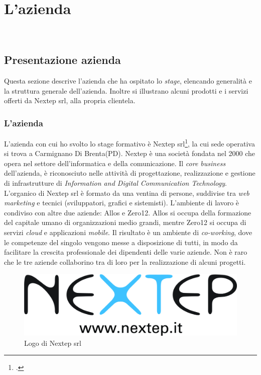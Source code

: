 
\chapter{L'azienda}
\label{cap:azienda}
\\




\section{Presentazione azienda}
Questa sezione descrive l'azienda che ha ospitato lo \emph{stage}, elencando generalità e la struttura generale dell'azienda. Inoltre si illustrano alcuni prodotti e i servizi offerti da Nextep srl, alla propria clientela.

\subsection{L'azienda}
L'azienda con cui ho svolto lo stage formativo è Nextep srl\footcite{http://www.nextep.it/}, la cui sede operativa si trova a Carmignano Di Brenta(PD). Nextep è una società fondata nel 2000 che opera nel settore dell'informatica e della comunicazione. Il \emph{\gls{core business}} dell'azienda, è riconosciuto nelle attività di progettazione, realizzazione e gestione di infrastrutture di \emph{Information and Digital Communication Technology}. L'organico di Nextep srl è formato da una ventina di persone, suddivise tra \emph{web marketing} e tecnici (sviluppatori, grafici e sistemisti). L'ambiente di lavoro è condiviso con altre due aziende: Allos  e Zero12. Allos si occupa della formazione del capitale umano di organizzazioni medio grandi, mentre Zero12  si occupa di servizi \emph{cloud} e applicazioni \emph{mobile}. Il risultato è un ambiente di \emph{co-working}, dove le competenze del singolo vengono messe a disposizione di tutti, in modo da facilitare la crescita professionale dei dipendenti delle varie aziende. Non è raro che le tre aziende collaborino tra di loro per la realizzazione di alcuni progetti.
\begin{figure}[h]
\centering
\includegraphics[scale=0.20]{immagini/logo_nextep}
\caption{Logo di Nextep srl}
\label{fig:logo_nextep}
\end{figure}

